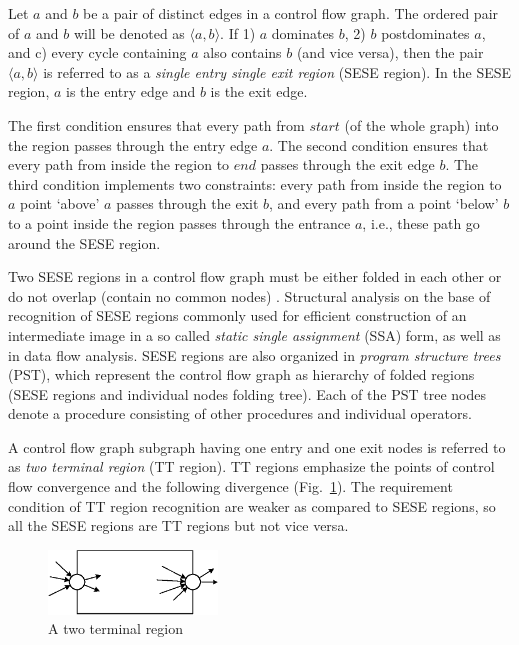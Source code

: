 \documentclass[conference]{IEEEtran}
\begin{document}
Let $a$ and $b$ be a pair of distinct edges in a control flow graph.  The ordered pair of $a$ and $b$ will be denoted as $\langle a,b \rangle$.  If 1) $a$ dominates $b$, 2) $b$ postdominates $a$, and c) every cycle containing $a$ also contains $b$ (and vice versa), then the pair $\langle a,b \rangle$ is referred to as a \emph{single entry single exit region} (SESE region).  In the SESE region, $a$ is the entry edge and $b$ is the exit edge.

The first condition ensures that every path from $start$ (of the whole graph) into the region passes through the entry edge $a$.  The second condition ensures that every path from inside the region to $end$ passes through the exit edge $b$.  The third condition implements two constraints: every path from inside the region to $a$ point ‘above’ $a$ passes through the exit $b$, and every path from a point ‘below’ $b$ to a point inside the region passes through the entrance $a$, i.e., these path go around the SESE region.

Two SESE regions in a control flow graph must be either folded in each other or do not overlap (contain no common nodes) \cite{sese}.  Structural analysis on the base of recognition of SESE regions commonly used for efficient construction of an intermediate image in a so called \emph{static single assignment} (SSA) form, as well as in data flow analysis.  SESE regions are also organized in \emph{program structure trees} (PST), which represent the control flow graph as hierarchy of folded regions (SESE regions and individual nodes folding tree).  Each of the PST tree nodes denote a procedure consisting of other procedures and individual operators.

A control flow graph subgraph having one entry and one exit nodes is referred to as \emph{two terminal region} (TT region).  TT regions emphasize the points of control flow convergence and the following divergence (Fig.~\ref{fig:TTRegion}).  The requirement condition of TT region recognition are weaker as compared to SESE regions, so all the SESE regions are TT regions but not vice versa.
\begin{figure}[tb]
	\centering
		\includegraphics[width=0.4\textwidth]{Pic/TTRegion.eps}
	\caption{A two terminal region}
	\label{fig:TTRegion}
\end{figure}
\end{document}
